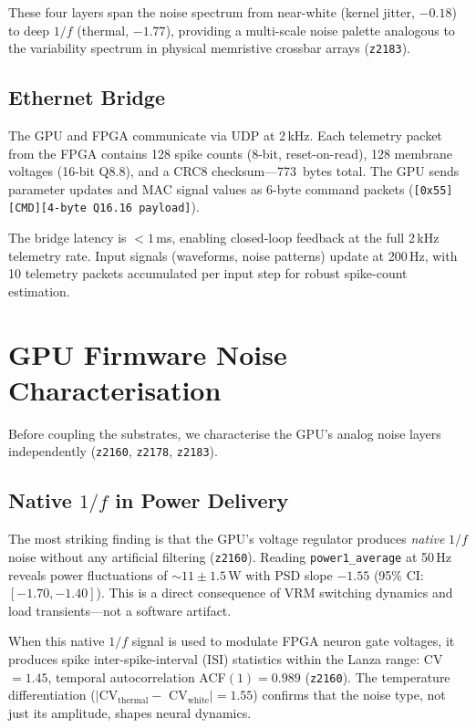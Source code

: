 \documentclass[11pt]{article}
\newcommand{\expt}[1]{\texttt{z#1}}
\begin{document}
These four layers span the noise spectrum from near-white
(kernel jitter, $-0.18$) to deep $1/f$ (thermal, $-1.77$),
providing a multi-scale noise palette analogous to the
variability spectrum in physical memristive crossbar
arrays (\expt{2183}).

\subsection{Ethernet Bridge}
\label{sec:bridge}

The GPU and FPGA communicate via UDP at 2\,kHz.  Each
telemetry packet from the FPGA contains 128 spike counts
(8-bit, reset-on-read), 128 membrane voltages (16-bit Q8.8),
and a CRC8 checksum---773~bytes total.  The GPU sends
parameter updates and MAC signal values as 6-byte command
packets (\texttt{[0x55][CMD][4-byte Q16.16 payload]}).

The bridge latency is $< 1$\,ms, enabling closed-loop
feedback at the full 2\,kHz telemetry rate.  Input signals
(waveforms, noise patterns) update at 200\,Hz, with 10
telemetry packets accumulated per input step for robust
spike-count estimation.


\section{GPU Firmware Noise Characterisation}
\label{sec:noise-char}

Before coupling the substrates, we characterise the GPU's
analog noise layers independently (\expt{2160}, \expt{2178},
\expt{2183}).

\subsection{Native $1/f$ in Power Delivery}

The most striking finding is that the GPU's voltage regulator
produces \emph{native} $1/f$ noise without any artificial
filtering (\expt{2160}).  Reading \texttt{power1\_average}
at 50\,Hz reveals power fluctuations of $\sim 11 \pm 1.5$\,W
with PSD slope $-1.55$ (95\% CI: $[-1.70, -1.40]$).  This is
a direct consequence of VRM switching dynamics and load
transients---not a software artifact.

When this native $1/f$ signal is used to modulate FPGA neuron
gate voltages, it produces spike inter-spike-interval (ISI)
statistics within the Lanza range: CV $= 1.45$, temporal
autocorrelation ACF$(1) = 0.989$ (\expt{2160}).  The
temperature differentiation ($|$CV$_\text{thermal} -$
CV$_\text{white}| = 1.55$) confirms that the noise type,
not just its amplitude, shapes neural dynamics.
\end{document}
